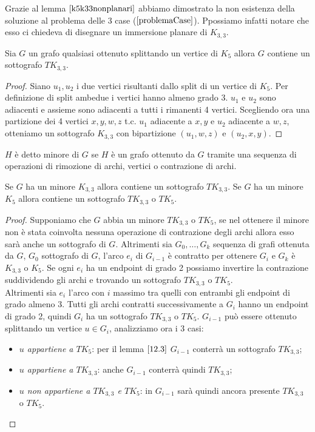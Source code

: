 Grazie al lemma \(\ref{k5k33nonplanari}\) abbiamo dimostrato la non esistenza della soluzione al problema delle 3 case (\(\ref{problemaCase}\)). Ppossiamo infatti notare che esso ci chiedeva di disegnare un immersione planare di \(K_{3,3}\).
\begin{lemma}\label{12.3}
    Sia \(G\) un grafo qualsiasi ottenuto splittando un vertice di \(K_5\) allora \(G\) contiene un sottografo \(TK_{3,3}\).
    \begin{proof}
        Siano \(u_1, u_2\) i due vertici risultanti dallo split di un vertice di \(K_5\). Per definizione di split ambedue i vertici hanno almeno grado 3. \(u_1\) e \(u_2\) sono adiacenti e assieme sono adiacenti a tutti i rimanenti 4 vertici. Scegliendo ora una partizione dei 4 vertici \(x,y,w,z\) t.c. \(u_1\) adiacente a \(x,y\) e \(u_2\) adiacente a \(w,z\), otteniamo un sottografo \(K_{3,3}\) con bipartizione \((u_1, w, z)\) e \((u_2,x,y)\).
    \end{proof}
\end{lemma}
\begin{definizione}[Minore]
    \(H\) è detto minore di \(G\) se \(H\) è un grafo ottenuto da \(G\) tramite una sequenza di operazioni di rimozione di archi, vertici o contrazione di archi.
\end{definizione}
\begin{teorema}\label{minoreTK5}
    Se \(G\) ha un minore \(K_{3,3}\) allora contiene un sottografo \(TK_{3,3}\). Se \(G\) ha un minore \(K_5\) allora contiene un sottografo \(TK_{3,3}\) o \(TK_5\).
    \begin{proof}
        Supponiamo che \(G\) abbia un minore \(TK_{3,3}\) o \(TK_5\), se nel ottenere il minore non è stata coinvolta nessuna operazione di contrazione degli archi allora esso sarà anche un sottografo di \(G\). Altrimenti sia \(G_0,\dots, G_k\) sequenza di grafi ottenuta da \(G\), \(G_0\) sottografo di \(G\), l'arco \(e_i\) di \(G_{i-1}\) è contratto per ottenere \(G_i\) e \(G_k\) è \(K_{3,3}\) o \(K_5\).
        Se ogni \(e_i\) ha un endpoint di grado 2 possiamo invertire la contrazione suddividendo gli archi e trovando un sottografo \(TK_{3,3}\) o \(TK_5\). 
        \\ Altrimenti sia \(e_i\) l'arco con \(i\) massimo tra quelli con entrambi gli endpoint di grado almeno 3. Tutti gli archi contratti successivamente a \(G_i\) hanno un endpoint di grado 2, quindi \(G_i\) ha un sottografo \(TK_{3,3}\) o \(TK_5\). \(G_{i-1}\) può essere ottenuto splittando un vertice \(u \in G_i\), analizziamo ora i 3 casi:
        \begin{itemize}
            \item \textit{\(u\) appartiene a \(TK_5\)}: per il lemma \(\ref{12.3}\) \(G_{i-1}\) conterrà un sottografo \(TK_{3,3}\);
            \item \textit{\(u\) appartiene a \(TK_{3,3}\)}: anche \(G_{i-1}\) conterrà quindi \(TK_{3,3}\);
            \item \textit{\(u\) non appartiene a \(TK_{3,3}\) e \(TK_5\)}: in \(G_{i-1}\) sarà quindi ancora presente \(TK_{3,3}\) o \(TK_5\).
        \end{itemize}
    \end{proof}
\end{teorema}
